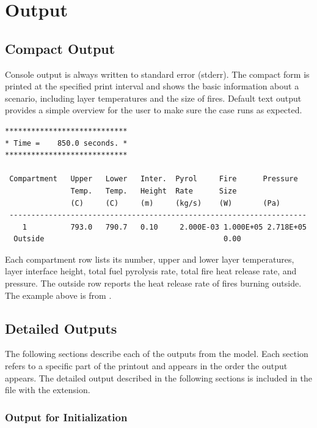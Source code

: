 
\chapter{Output}
\label{Output_Chapter}




\section{Compact Output}

Console output is always written to standard error (stderr). The compact form is printed at the specified print interval and shows the basic information about a scenario, including layer temperatures and the size of fires. Default text output provides a simple overview for the user to make sure the case runs as expected.
\begin{lstlisting}[basicstyle=\scriptsize]
****************************
* Time =    850.0 seconds. *
****************************

 Compartment   Upper   Lower   Inter.  Pyrol     Fire      Pressure
               Temp.   Temp.   Height  Rate      Size
               (C)     (C)     (m)     (kg/s)    (W)       (Pa)
 --------------------------------------------------------------------
    1          793.0   790.7   0.10     2.000E-03 1.000E+05 2.718E+05
  Outside                                         0.00
\end{lstlisting}
Each compartment row lists its number, upper and lower layer temperatures, layer interface height, total fuel pyrolysis rate, total fire heat release rate, and pressure. The outside row reports the heat release rate of fires burning outside. The example above is from .

\section{Detailed Outputs}

The following sections describe each of the outputs from the model.  Each section refers to a specific part of the printout and appears in the order the output appears. The detailed output described in the following sections is included in the file with the  extension.

\subsection{Output for Initialization}

